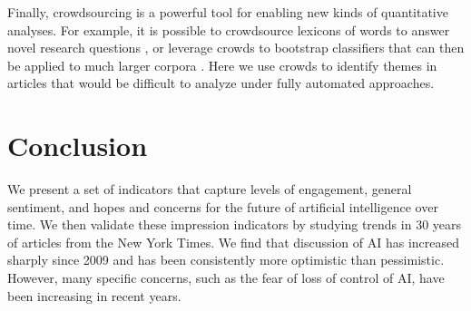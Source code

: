 \documentclass[letterpaper]{article}
\begin{document}
Finally, crowdsourcing is a powerful tool for enabling new kinds of quantitative analyses. For example, it is possible to crowdsource lexicons of words to answer novel research questions \cite{empath}, or leverage crowds to bootstrap classifiers that can then be applied to much larger corpora \cite{politeness,dogmatism}. Here we use crowds to identify themes in articles that would be difficult to analyze under fully automated approaches.

\section{Conclusion}
We present a set of indicators that capture levels of engagement, general sentiment, and hopes and concerns for the future of artificial intelligence over time. We then validate these impression indicators by studying trends in 30 years of articles from the New York Times. We find that discussion of AI has increased sharply since 2009 and has been consistently more optimistic than pessimistic. However, many specific concerns, such as the fear of loss of control of AI, have been increasing in recent years. 
\end{document}
